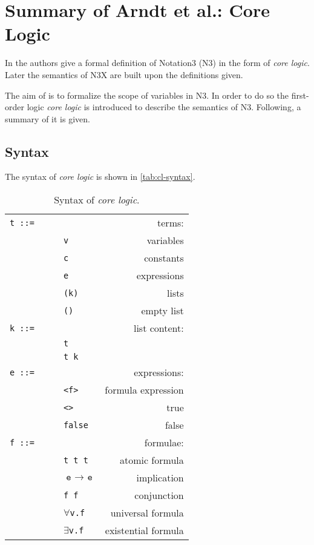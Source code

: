 \documentclass[runningheads]{llncs}
\begin{document}
\section{Summary of Arndt et al.: Core Logic}
\label{sec:def}

In \cite{Arndt.2019} the authors give a formal definition of Notation3 (N3) in the form of \emph{core logic}.
Later the semantics of N3X are built upon the definitions given.

The aim of \cite{Arndt.2019} is to formalize the scope of variables in N3.
In order to do so the first-order logic \emph{core logic} is introduced to describe the semantics of N3.
Following, a summary of it is given.



\subsection{Syntax}
\label{sec:def-core-syntax}

The syntax of \emph{core logic} is shown in \autoref{tab:cl-syntax}.

\begin{table}
  \centering
  \caption{Syntax of \emph{core logic}.}
  \label{tab:cl-syntax}
  \begin{tabular}{llr}
    \toprule
    \texttt{t ::=}$\qquad$ &  & terms: \\
      & \texttt{v}            & variables \\
      & \texttt{c}            & constants \\
      & \texttt{e}            & expressions \\
      & \texttt{(k)}          & lists \\
      & \texttt{()}           & empty list \\[0.5cm]
    \texttt{k ::=} &          & list content: \\
      & \texttt{t}            & \\
      & \texttt{t k}          & \\[0.5cm]
    \texttt{e ::=} &          & expressions: \\
      & \texttt{<f>}          & formula expression \\
      & \texttt{<>}           & true \\
      & \texttt{false}        & false \\[0.5cm]
    \texttt{f ::=} &          & formulae: \\
      & \texttt{t t t}        & atomic formula \\
      & $\texttt{e } \rightarrow \texttt{ e}$ & implication \\
      & \texttt{f f}          & conjunction \\
      & $\forall$\texttt{v.f} & universal formula \\
      & $\exists$\texttt{v.f} & existential formula \\
    \bottomrule
  \end{tabular}
\end{table}
\end{document}
